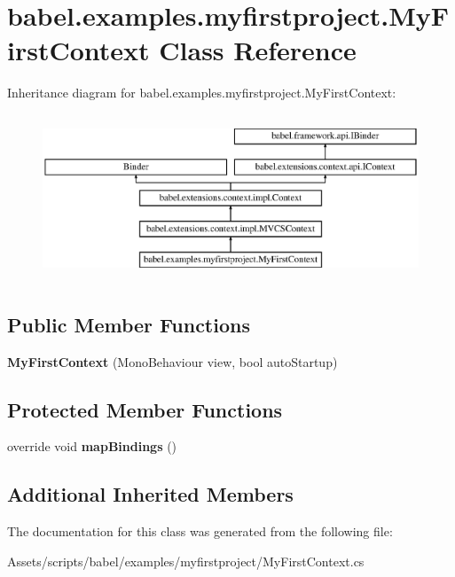 \hypertarget{classbabel_1_1examples_1_1myfirstproject_1_1_my_first_context}{\section{babel.\-examples.\-myfirstproject.\-My\-First\-Context Class Reference}
\label{classbabel_1_1examples_1_1myfirstproject_1_1_my_first_context}
}
Inheritance diagram for babel.\-examples.\-myfirstproject.\-My\-First\-Context\-:\begin{figure}[H]
\begin{center}
\leavevmode
\includegraphics[height=5.000000cm]{classbabel_1_1examples_1_1myfirstproject_1_1_my_first_context}
\end{center}
\end{figure}
\subsection*{Public Member Functions}
\begin{DoxyCompactItemize}
\item 
\hypertarget{classbabel_1_1examples_1_1myfirstproject_1_1_my_first_context_a5e45c658aeb8076f1da3fd878c7c93bd}{{\bfseries My\-First\-Context} (Mono\-Behaviour view, bool auto\-Startup)}\label{classbabel_1_1examples_1_1myfirstproject_1_1_my_first_context_a5e45c658aeb8076f1da3fd878c7c93bd}

\end{DoxyCompactItemize}
\subsection*{Protected Member Functions}
\begin{DoxyCompactItemize}
\item 
\hypertarget{classbabel_1_1examples_1_1myfirstproject_1_1_my_first_context_a01d62f40e407de550b54350e3eb7451a}{override void {\bfseries map\-Bindings} ()}\label{classbabel_1_1examples_1_1myfirstproject_1_1_my_first_context_a01d62f40e407de550b54350e3eb7451a}

\end{DoxyCompactItemize}
\subsection*{Additional Inherited Members}


The documentation for this class was generated from the following file\-:\begin{DoxyCompactItemize}
\item 
Assets/scripts/babel/examples/myfirstproject/My\-First\-Context.\-cs\end{DoxyCompactItemize}
